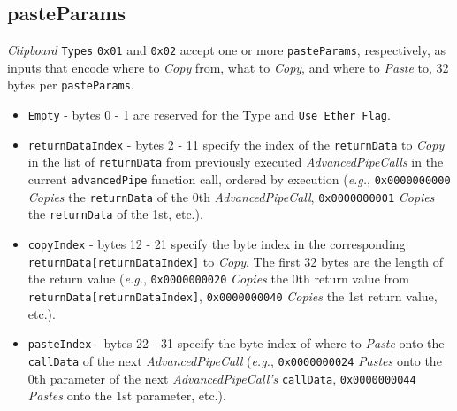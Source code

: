\documentclass[tikz]{article}
\newcommand{\code}[1]{\texttt{#1}}
\newcommand{\term}[1]{\textsl{#1}}
\begin{document}
\subsection{pasteParams}
\term{Clipboard} \code{Types} \code{0x01} and \code{0x02} accept one or more \code{pasteParams}, respectively, as inputs that encode where to \term{Copy} from, what to \term{Copy}, and where to \term{Paste} to, 32 bytes per \code{pasteParams}. 

\begin{itemize}
    \item \code{Empty} - bytes 0 - 1 are reserved for the Type and \code{Use Ether Flag}.
    \item \code{returnDataIndex} - bytes 2 - 11 specify the index of the \code{returnData} to \term{Copy} in the list of \code{returnData} from previously executed \term{AdvancedPipeCalls} in the current \code{advancedPipe} function call, ordered by execution (\term{e.g.}, \code{0x0000000000} \term{Copies} the \code{returnData} of the 0th \term{AdvancedPipeCall}, \code{0x0000000001} \term{Copies} the \code{returnData} of the 1st, etc.).
    \item \code{copyIndex} - bytes 12 - 21 specify the byte index in the corresponding \code{returnData[returnDataIndex]} to \term{Copy}. The first 32 bytes are the length of the return value (\term{e.g.}, \code{0x0000000020} \term{Copies} the 0th return value from \code{returnData[returnDataIndex]}, \code{0x0000000040} \term{Copies} the 1st return value, etc.).
    \item \code{pasteIndex} - bytes 22 - 31 specify the byte index of where to \term{Paste} onto the \code{callData} of the next \term{AdvancedPipeCall} (\term{e.g.}, \code{0x0000000024} \term{Pastes} onto the 0th parameter of the next \term{AdvancedPipeCall's} \code{callData}, \code{0x0000000044} \term{Pastes} onto the 1st parameter, etc.). 
\end{itemize}
\end{document}
